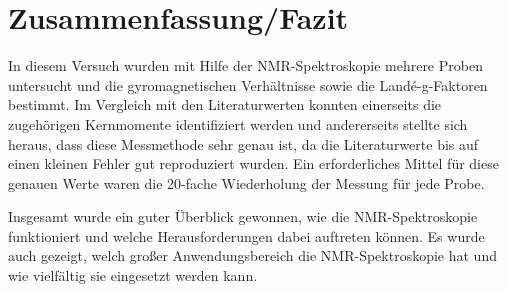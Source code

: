 \section{Zusammenfassung/Fazit}
In diesem Versuch wurden mit Hilfe der NMR-Spektroskopie mehrere Proben untersucht und die gyromagnetischen Verhältnisse sowie die Landé-g-Faktoren bestimmt. Im Vergleich mit den Literaturwerten konnten einerseits die zugehörigen Kernmomente identifiziert werden und andererseits stellte sich heraus, dass diese Messmethode sehr genau ist, da die Literaturwerte bis auf einen kleinen Fehler gut reproduziert wurden. Ein erforderliches Mittel für diese genauen Werte waren die 20-fache Wiederholung der Messung für jede Probe.

Insgesamt wurde ein guter Überblick gewonnen, wie die NMR-Spektroskopie funktioniert und welche Herausforderungen dabei auftreten können. Es wurde auch gezeigt, welch großer Anwendungsbereich die NMR-Spektroskopie hat und wie vielfältig sie eingesetzt werden kann.
